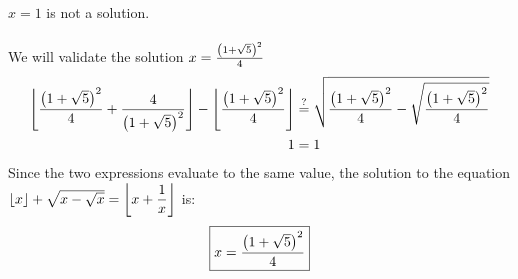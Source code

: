 \documentclass[article,12pt]{article}
\newcounter{question}
\DeclarePairedDelimiter\floor{\lfloor}{\rfloor}
\DeclarePairedDelimiter\paren{(}{)}
\newcommand{\df}{\displaystyle\frac} %
\newcommand{\qeq}{\overset{?}{=}} %
\begin{document}
$x=1$ is not a solution. \\
\\
We will validate the solution $x=\frac{\paren*{1 + \sqrt{5}}^2}{4}$
\begin{align*}
    \floor*{\frac{\paren*{1 + \sqrt{5}}^2}{4} + \df{4}{\paren*{1 + \sqrt{5}}^2}} - \floor*{\frac{\paren*{1 + \sqrt{5}}^2}{4}} &\qeq \sqrt{\frac{\paren*{1 + \sqrt{5}}^2}{4} - \sqrt{\frac{\paren*{1 + \sqrt{5}}^2}{4}}} \\
    1 &= 1
\end{align*}
Since the two expressions evaluate to the same value, the solution to the equation $\floor*{x} + \sqrt{x - \sqrt{x}} = \floor*{x + \displaystyle\frac{1}{x}}$ is: \[ \boxed{x=\frac{\paren*{1 + \sqrt{5}}^2}{4}} \]
\end{document}
